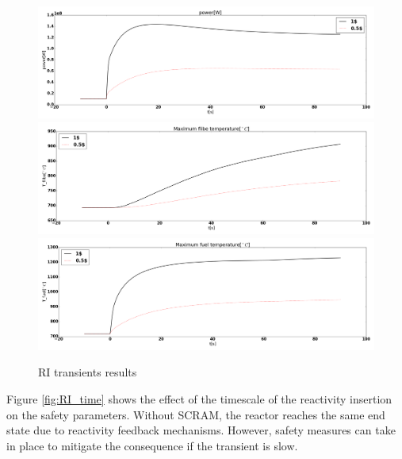 \documentclass{elsarticle}
\begin{document}
\begin{figure}[h]
    \centering
        \includegraphics[width=1\linewidth]{./images/diffusion/tmsr/RI/diff_pcm/power.png}
        \includegraphics[width=1\textwidth]{./images/diffusion/tmsr/RI/diff_pcm/T_flibe_max.png}
        \includegraphics[width=1\textwidth]{./images/diffusion/tmsr/RI/diff_pcm/T_fuel_max.png}
    \caption{RI transients results}
    \label{fig:RI_pcm}
\end{figure}


Figure \ref{fig:RI_time} shows the effect of the timescale of the reactivity insertion on the safety parameters. Without SCRAM, the reactor reaches the same end state due to reactivity feedback mechanisms. However, safety measures can take in place to mitigate the consequence if the transient is slow. 
\end{document}
